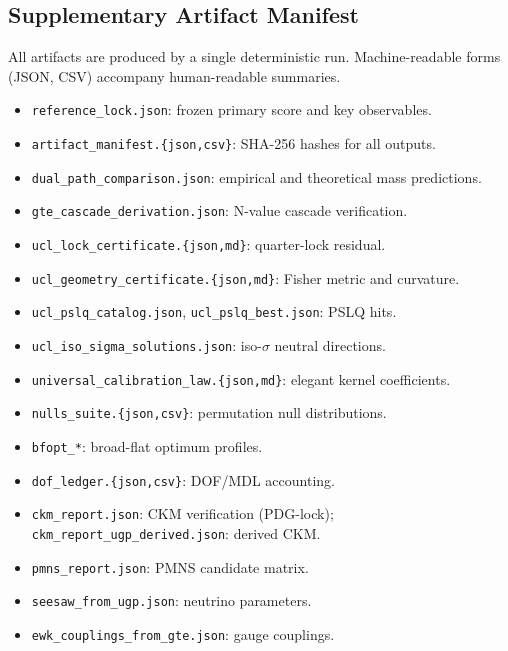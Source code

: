 \documentclass[11pt]{article}
\theoremstyle{remark}
\begin{document}
\begin{appendices}
\section{Supplementary Artifact Manifest}
\label{app:artifacts}

All artifacts are produced by a single deterministic run.
Machine-readable forms (JSON, CSV) accompany human-readable summaries.

\begin{itemize}[leftmargin=1.2em,itemsep=0.2em]
    \item \texttt{reference\_lock.json}: frozen primary score and key observables.
    \item \texttt{artifact\_manifest.\{json,csv\}}: SHA-256 hashes for all outputs.
    \item \texttt{dual\_path\_comparison.json}: empirical and theoretical mass predictions.
    \item \texttt{gte\_cascade\_derivation.json}: N-value cascade verification.
    \item \texttt{ucl\_lock\_certificate.\{json,md\}}: quarter-lock residual.
    \item \texttt{ucl\_geometry\_certificate.\{json,md\}}: Fisher metric and curvature.
    \item \texttt{ucl\_pslq\_catalog.json}, \texttt{ucl\_pslq\_best.json}: PSLQ hits.
    \item \texttt{ucl\_iso\_sigma\_solutions.json}: iso-$\sigma$ neutral directions.
    \item \texttt{universal\_calibration\_law.\{json,md\}}: elegant kernel coefficients.
    \item \texttt{nulls\_suite.\{json,csv\}}: permutation null distributions.
    \item \texttt{bfopt\_*}: broad-flat optimum profiles.
    \item \texttt{dof\_ledger.\{json,csv\}}: DOF/MDL accounting.
    \item \texttt{ckm\_report.json}: CKM verification (PDG-lock); \texttt{ckm\_report\_ugp\_derived.json}: derived CKM.
    \item \texttt{pmns\_report.json}: PMNS candidate matrix.
    \item \texttt{seesaw\_from\_ugp.json}: neutrino parameters.
    \item \texttt{ewk\_couplings\_from\_gte.json}: gauge couplings.

\end{itemize}
\end{appendices}
\end{document}
